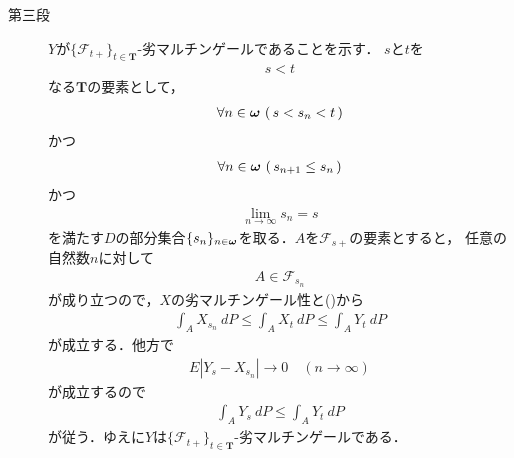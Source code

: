 \begin{sketch}
\begin{description}
			\item[第三段]
				$Y$が$\{\mathscr{F}_{t+}\}_{t \in \mathbf{T}}$-劣マルチンゲールであることを示す．
				$s$と$t$を
				\begin{align}
					s < t
				\end{align}
				なる$\mathbf{T}$の要素として，
				\begin{align}
					\forall n \in {\boldsymbol \omega}\, \left(\, s < s_n < t\, \right)
				\end{align}
				かつ
				\begin{align}
					\forall n \in {\boldsymbol \omega}\, \left(\, s_{n+1} \leq s_n\, \right)
				\end{align}
				かつ
				\begin{align}
					\lim_{n \to \infty} s_n = s
				\end{align}
				を満たす$D$の部分集合$\{s_n\}_{n \in {\boldsymbol \omega}}$を取る．$A$を$\mathscr{F}_{s+}$の要素とすると，
				任意の自然数$n$に対して
				\begin{align}
					A \in \mathscr{F}_{s_n}
				\end{align}
				が成り立つので，$X$の劣マルチンゲール性と()から
				\begin{align}
					\int_A X_{s_n}\ dP \leq \int_A X_t\ dP \leq \int_A Y_t\ dP
				\end{align}
				が成立する．他方で
				\begin{align}
					E\left|Y_s - X_{s_n}\right| \longrightarrow 0 \quad (n \longrightarrow \infty)
				\end{align}
				が成立するので
				\begin{align}
					\int_A Y_s\ dP \leq \int_A Y_t\ dP
				\end{align}
				が従う．ゆえに$Y$は$\{\mathscr{F}_{t+}\}_{t \in \mathbf{T}}$-劣マルチンゲールである．
				

\end{description}
\end{sketch}
